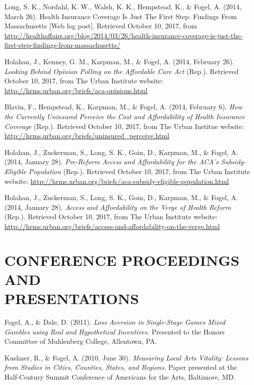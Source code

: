 \documentclass[margin, 10pt]{res} %
\begin{document}
\begin{resume}
Long, S. K., Nordahl, K. W., Walsh, K. K., Hempstead, K., \& Fogel, A. (2014, March 26). Health Insurance Coverage Is Just The First Step: Findings From Massachusetts [Web log post]. Retrieved October 10, 2017, from \url{http://healthaffairs.org/blog/2014/03/26/health-insurance-coverage-is-just-the-first-step-findings-from-massachusetts/}

Holahan, J., Kenney, G. M., Karpman, M., \& Fogel, A. (2014, February 26). {\sl Looking Behind Opinion Polling on the Affordable Care Act} (Rep.). Retrieved October 10, 2017, from The Urban Institute website: \url{http://hrms.urban.org/briefs/aca-opinions.html}

Blavin, F., Hempstead, K., Karpman, M., \& Fogel, A. (2014, February 6). {\sl How the Currently Uninsured Perceive the Cost and Affordability of Health Insurance Coverage} (Rep.). Retrieved October 10, 2017, from The Urban Institue website: \url{http://hrms.urban.org/briefs/uninsured_perceive.html}

Holahan, J., Zuckerman, S., Long, S. K., Goin, D., Karpman, M., \& Fogel, A. (2014, January 28). {\sl Pre-Reform Access and Affordability for the ACA's Subsidy-Eligible Population} (Rep.). Retrieved October 10, 2017, from The Urban Institute website: \url{http://hrms.urban.org/briefs/aca-subsidy-eligible-population.html}

Holahan, J., Zuckerman, S., Long, S. K., Goin, D., Karpman, M., \& Fogel, A. (2014, January 28). {\sl Access and Affordability on the Verge of Health Reform} (Rep.). Retrieved October 10, 2017, from The Urban Institute website: \url{http://hrms.urban.org/briefs/access-and-affordability-on-the-verge.html}



\section{\small\bf CONFERENCE PROCEEDINGS AND \\ PRESENTATIONS}
Fogel, A., \& Dale, D. (2011). {\sl Loss Aversion in Single-Stage Games Mixed Gambles using Real and Hypothetical Incentives.} Presented to the Honors Committee of Muhlenberg College, Allentown, PA.

Kushner, R., \& Fogel, A. (2010, June 30). {\sl Measuring Local Arts Vitality: Lessons from Studies in Cities, Counties, States, and Regions}. Paper presented at the Half-Century Summit Conference of Americans for the Arts, Baltimore, MD.



\end{resume}
\end{document}
